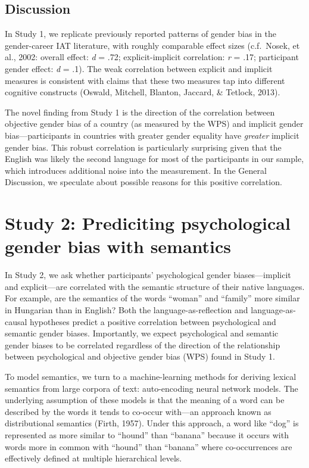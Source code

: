 \documentclass[10pt, letterpaper]{article}
\begin{document}
\subsection{Discussion}\label{discussion}

In Study 1, we replicate previously reported patterns of gender bias in
the gender-career IAT literature, with roughly comparable effect sizes
(c.f.~Nosek, et al., 2002: overall effect: \emph{d} = .72;
explicit-implicit correlation: \emph{r} = .17; participant gender
effect: \emph{d} = .1). The weak correlation between explicit and
implicit measures is consistent with claims that these two measures tap
into different cognitive constructs (Oswald, Mitchell, Blanton, Jaccard,
\& Tetlock, 2013).

The novel finding from Study 1 is the direction of the correlation
between objective gender bias of a country (as measured by the WPS) and
implicit gender bias---participants in countries with greater gender
equality have \emph{greater} implicit gender bias. This robust
correlation is particularly surprising given that the English was likely
the second language for most of the participants in our sample, which
introduces additional noise into the measurement. In the General
Discussion, we speculate about possible reasons for this positive
correlation.

\section{Study 2: Prediciting psychological gender bias with
semantics}\label{study-2-prediciting-psychological-gender-bias-with-semantics}

In Study 2, we ask whether participants' psychological gender
biases---implicit and explicit---are correlated with the semantic
structure of their native languages. For example, are the semantics of
the words ``woman'' and ``family'' more similar in Hungarian than in
English? Both the language-as-reflection and language-as-causal
hypotheses predict a positive correlation between psychological and
semantic gender biases. Importantly, we expect psychological and
semantic gender biases to be correlated regardless of the direction of
the relationship between psychological and objective gender bias (WPS)
found in Study 1.

To model semantics, we turn to a machine-learning methods for deriving
lexical semantics from large corpora of text: auto-encoding neural
network models. The underlying assumption of these models is that the
meaning of a word can be described by the words it tends to co-occur
with---an approach known as distributional semantics (Firth, 1957).
Under this approach, a word like ``dog'' is represented as more similar
to ``hound'' than ``banana'' because it occurs with words more in common
with ``hound'' than ``banana'' where co-occurrences are effectively
defined at multiple hierarchical levels.
\end{document}
